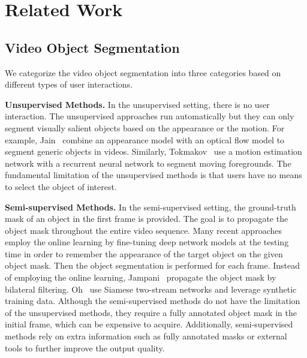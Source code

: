 \documentclass[10pt,twocolumn,letterpaper]{article}
\renewcommand{\paragraph}[1]{\vspace{1mm}\noindent\textbf{#1}}
\begin{document}
\section{Related Work}
\subsection{Video Object Segmentation} We categorize the video object segmentation into three categories based on different types of user interactions.

\paragraph{Unsupervised Methods.} In the unsupervised setting, there is no user interaction. The unsupervised approaches run automatically but they can only segment visually salient objects based on the appearance or the motion. For example, Jain~\etal\cite{jain2017fusionseg} combine an appearance model with an optical flow model to segment generic objects in videos. Similarly, Tokmakov~\etal\cite{tokmakov2017learning} use a motion estimation network with a recurrent neural network to segment moving foregrounds. The fundamental limitation of the unsupervised methods is that users have no means to select the object of interest.

\paragraph{Semi-supervised Methods.} In the semi-supervised setting, the ground-truth mask of an object in the first frame is provided. The goal is to propagate the object mask throughout the entire video sequence. Many recent approaches~\cite{caelles2017one,voigtlaender2017online,maninis2017video} employ the online learning by fine-tuning deep network models at the testing time in order to remember the appearance of the target object on the given object mask.
Then the object segmentation is performed for each frame. 
Instead of employing the online learning, Jampani~\etal\cite{jampani2016video} propagate the object mask by bilateral filtering. Oh~\etal\cite{oh2018fast} use Siamese two-stream networks and leverage synthetic training data.
Although the semi-supervised methods do not have the limitation of the unsupervised methods, they require a fully annotated object mask in the initial frame, which can be expensive to acquire. 
Additionally, semi-supervised methods rely on extra information such as fully annotated masks or external tools to further improve the output quality.
\end{document}
